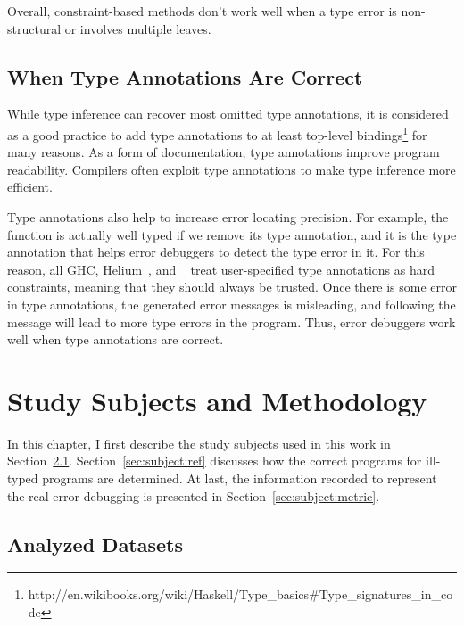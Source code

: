 \documentclass[12pt]{report}	%
\begin{document}
Overall, constraint-based methods don't work well when a type
error is non-structural or involves multiple leaves.

\section{When Type Annotations Are Correct}
\label{sec:background:annotations}

While type inference can recover most omitted
type annotations, it is considered as a good
practice to add type annotations to at least
top-level bindings\footnote{http://en.wikibooks.org/wiki/Haskell/Type\_basics\#Type\_signatures\_in\_code}
for many reasons. As a form of documentation, type annotations improve
program readability. Compilers often exploit type annotations
to make type inference more efficient.

Type annotations also help to increase error
locating precision. For example,
the function  is
actually well typed if we remove its type annotation,
and it is the type annotation that helps error debuggers to detect
the type error in it. For this reason,
all GHC, Helium~\cite{Heeren03:HLH,Heeren05:TQT},
and \toolMin~\cite{Pavlinovic14:FMT,Pavlinovic15:PST}
treat user-specified type annotations as hard
constraints, meaning that they should always be trusted.
Once there is some error in type annotations, the
generated error messages is misleading, and following the
message will lead to more type errors in the program.
Thus, error debuggers work well when type annotations
are correct.

\chapter{Study Subjects and Methodology}
\label{sec:subjects}

In this chapter, I first describe the study subjects used in this work in Section~\ref{sec:subjects:db}.
Section~\ref{sec:subject:ref} discusses how the correct programs for ill-typed programs are determined.
At last, the information recorded to represent the real error debugging is presented in Section~\ref{sec:subject:metric}.


\section{Analyzed Datasets}
\label{sec:subjects:db}
\end{document}
